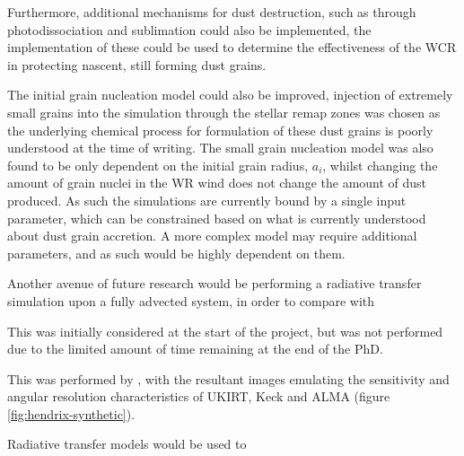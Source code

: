 Furthermore, additional mechanisms for dust destruction, such as through photodissociation and sublimation could also be implemented, the implementation of these could be used to determine the effectiveness of the WCR in protecting nascent, still forming dust grains.


The initial grain nucleation model could also be improved, injection of extremely small grains into the simulation through the stellar remap zones was chosen as the underlying chemical process for formulation of these dust grains is poorly understood at the time of writing.
The small grain nucleation model was also found to be only dependent on the initial grain radius, $a_i$, whilst changing the amount of grain nuclei in the WR wind does not change the amount of dust produced.
As such the simulations are currently bound by a single input parameter, which can be constrained based on what is currently understood about dust grain accretion.
A more complex model may require additional parameters, and as such would be highly dependent on them.


Another avenue of future research would be performing a radiative transfer simulation upon a fully advected system, in order to compare with 

This was initially considered at the start of the project, but was not performed due to the limited amount of time remaining at the end of the PhD.

This was performed by \textcite{hendrix_pinwheels_2016}, with the resultant images emulating the sensitivity and angular resolution characteristics of UKIRT, Keck and ALMA (figure \ref{fig:hendrix-synthetic}).

Radiative transfer models would be used to 

